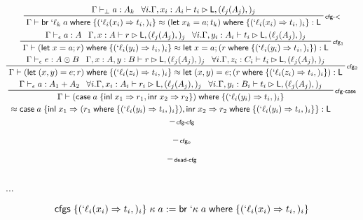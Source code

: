 \documentclass[acmsmall,screen,review]{acmart}
\newcommand{\ms}[1]{\ensuremath{\mathsf{#1}}}
\newcommand{\lbl}[1]{{`#1}}
\newcommand{\lto}{\Rightarrow}
\newcommand{\linl}[1]{\ms{inl}\;{#1}}
\newcommand{\linr}[1]{\ms{inr}\;{#1}}
\newcommand{\letstmt}[3]{\ensuremath{\ms{let}\;#1 = #2; #3}}
\newcommand{\brb}[2]{\ms{br}\;#1\;#2}
\newcommand{\lbrb}[2]{\brb{\lbl{#1}}{#2}}
\newcommand{\casestmt}[5]{\ms{case}\;#1\;\{\linl{#2} \lto #3, \linr{#4} \lto #5\}}
\newcommand{\where}[2]{#1\;\ms{where}\;\{#2\}}
\newcommand{\wbranch}[3]{#1(#2) \lto #3}
\newcommand{\lwbranch}[3]{\wbranch{\lbl{#1}}{#2}{#3}}
\newcommand{\cfgsubst}[1]{\ms{cfgs}\;\{#1\}}
\newcommand{\bhyp}[2]{#1 : #2}
\newcommand{\lhyp}[2]{#1(#2)}
\newcommand{\rle}[1]{{\scriptsize\textsf{#1}}}
\newcommand{\hasty}[4]{#1 \vdash_{#2} #3: {#4}}
\newcommand{\haslb}[3]{#1 \vdash #2 \rhd #3}
\newcommand{\teqv}{\approx}
\newcommand{\lbeq}[4]{#1 \vdash #2 \teqv #3 : {#4}}
\begin{document}
\begin{gather*}
    \prftree[r]{\rle{cfg-$<$}}
      {\hasty{\Gamma}{\bot}{a}{A_k}}
      {\forall i. \haslb{\Gamma, \bhyp{x_i}{A_i}}{t_i}{\ms{L}, (\lhyp{\ell_j}{A_j},)_j}}
      {\lbeq{\Gamma}
        {\where{\lbrb{\ell_k}{a}}{(\lwbranch{\ell_i}{x_i}{t_i},)_i}}
        {\where{(\letstmt{x_k}{a}{t_k})}{(\lwbranch{\ell_i}{x_i}{t_i},)_i}}
        {\ms{L}}}
    \\
    \prftree[r]{\rle{cfg$_1$}}
      {\hasty{\Gamma}{\epsilon}{a}{A}}
      {\haslb{\Gamma, \bhyp{x}{A}}{r}{\ms{L}, (\lhyp{\ell_j}{A_j},)_j}}
      {\forall i. \haslb{\Gamma, \bhyp{y_i}{A_i}}{t_i}{\ms{L}, (\lhyp{\ell_j}{A_j},)_j}}
      {\lbeq{\Gamma}
        {\where{(\letstmt{x}{a}{r})}{(\lwbranch{\ell_i}{y_i}{t_i},)_i}}
        {\letstmt{x}{a}{(\where{r}{(\lwbranch{\ell_i}{y_i}{t_i},)_i})}}
        {\ms{L}}}
    \\
    \prftree[r]{\rle{cfg$_2$}}
      {\hasty{\Gamma}{\epsilon}{e}{A \otimes B}}
      {\haslb{\Gamma, \bhyp{x}{A}, \bhyp{y}{B}}{r}{\ms{L}, (\lhyp{\ell_j}{A_j},)_j}}
      {\forall i. \haslb{\Gamma, \bhyp{z_i}{C_i}}{t_i}{\ms{L}, (\lhyp{\ell_j}{A_j},)_j}}
      {\lbeq{\Gamma}
        {\where{(\letstmt{(x, y)}{e}{r})}{(\lwbranch{\ell_i}{z_i}{t_i},)_i}}
        {\letstmt{(x, y)}{e}{(\where{r}{(\lwbranch{\ell_i}{z_i}{t_i},)_i})}}
        {\ms{L}}}
    \\
    \prftree[r]{\rle{cfg-case}}
      {\hasty{\Gamma}{\epsilon}{a}{A_1 + A_2}}
      {\forall i. \haslb{\Gamma, \bhyp{x_i}{A_i}}{r_i}{\ms{L}, (\lhyp{\ell_j}{A_j},)_j}}
      {\forall i. \haslb{\Gamma, \bhyp{y_i}{B_i}}{t_i}{\ms{L}, (\lhyp{\ell_j}{A_j},)_j}}
      {
        \prfStackPremises
        {\Gamma \vdash \where{(\casestmt{a}{x_1}{r_1}{x_2}{r_2})}
          {(\lwbranch{\ell_i}{y_i}{t_i},)_i} }
        {\approx \casestmt{a}
          {x_1}{(\where{r_1}{(\lwbranch{\ell_i}{y_i}{t_i},)_i})}
          {x_2}{\where{r_2}{(\lwbranch{\ell_i}{y_i}{t_i},)_i}} : \ms{L}}
      }
    \\
    \prftree[r]{\rle{cfg-cfg}}
      {}
    \\
    \prftree[r]{\rle{cfg$_0$}}
      {}
    \\
    \prftree[r]{\rle{dead-cfg}}
      {}
\end{gather*}

...

\begin{equation*}
  \cfgsubst{(\lwbranch{\ell_i}{x_i}{t_i},)_i}\;\kappa\;a
  := \where{\lbrb{\kappa}{a}}{(\lwbranch{\ell_i}{x_i}{t_i},)_i}
\end{equation*}
\end{document}
